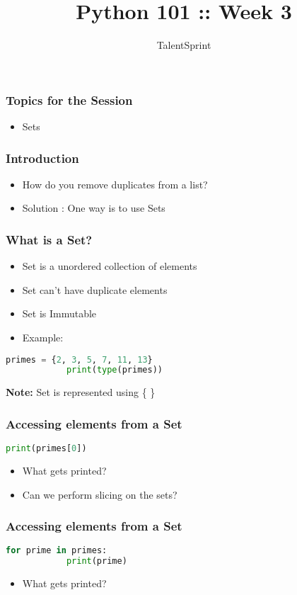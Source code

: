 \documentclass[14pt]{beamer}
\title{Python 101 :: Week 3}
\date{}
\author[TS]{TalentSprint}
\begin{document}
    \begin{frame}
        \titlepage
    \end{frame}
    \begin{frame}
	\frametitle{Topics for the Session}
	\begin{itemize}
	    \item Sets
	\end{itemize}
    \end{frame}
    \begin{frame}
	\frametitle{Introduction}
	\begin{itemize}
	    \item \alert{How do you remove duplicates from a list? }
	    \pause
	    \item Solution : One way is to use Sets
	\end{itemize}
    \end{frame}
    \begin{frame}[containsverbatim]
	\frametitle{What is a Set?}
	\begin{itemize}
	    \item Set is a unordered collection of elements
            \item Set can't have duplicate elements 
	    \item Set is Immutable
	    \item \alert{Example:}
	\end{itemize}
	\begin{lstlisting}[language=python]
	    primes = {2, 3, 5, 7, 11, 13}
            print(type(primes))
	\end{lstlisting}
	\textbf{Note:} Set is represented using \{ \}	
    \end{frame}
    \begin{frame}[containsverbatim]
	\frametitle{Accessing elements from a Set}
	\begin{lstlisting}[language=python]
	    print(primes[0])
	\end{lstlisting}
	\begin{itemize}
	    \item What gets printed?
	    \item Can we perform slicing on the sets?
	\end{itemize}
    \end{frame}
    \begin{frame}[containsverbatim]
	\frametitle{Accessing elements from a Set}
	\begin{lstlisting}[language=python]
	    for prime in primes:
	        print(prime)
	\end{lstlisting}
	\begin{itemize}
	    \item What gets printed?
	\end{itemize}
    \end{frame}
\end{document}
